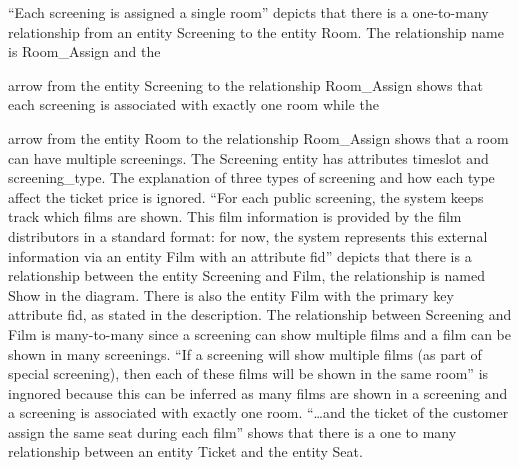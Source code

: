 \documentclass{article}
\begin{document}
``Each screening is assigned a single room'' depicts that there is a one-to-many
relationship from an entity Screening to the entity Room. The relationship name
is Room\_Assign and the
arrow from the entity Screening to the relationship Room\_Assign shows that each
screening is associated with exactly one room while the
arrow from the entity Room to the relationship Room\_Assign shows that a room
can have multiple screenings. The Screening entity has attributes timeslot and
screening\_type. The explanation of three types of screening and how each type
affect the ticket price is ignored. ``For each public screening, the system keeps
track which films are shown. This film information is provided by the film
distributors in a standard format: for now, the system represents this external
information via an entity Film with an attribute fid'' depicts that there is a
relationship between the entity Screening and Film, the relationship is named
Show in the diagram. There is also the entity Film with the primary key attribute
fid, as stated in the description. The relationship between Screening and Film
is many-to-many since a screening can show multiple films and a film can be shown
in many screenings. ``If a screening will show multiple films (as part of special
screening), then each of these films will be shown in the same room'' is ingnored
because this can be inferred as many films are shown in a screening and a
screening is associated with exactly one room. ``\dots and the ticket of the
customer assign the same seat during each film'' shows that there is a one to
many relationship between an entity Ticket and the entity Seat.
 
\end{document}
